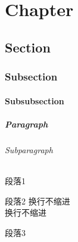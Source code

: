 \documentclass[UTF8]{ctexrep}
\begin{document}
% 
\chapter{Chapter}
\section{Section}
\subsection{Subsection}
\subsubsection{Subsubsection}
\paragraph{Paragraph}
\subparagraph{Subparagraph}

% 
\clearpage
\par 段落1
\par 段落2
\newline 换行不缩进
\\ 换行不缩进
\par{段落3}
\end{document}
